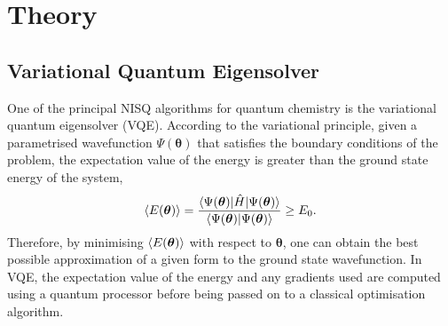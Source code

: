 \documentclass[%
 reprint,
 amsmath,amssymb,
 aps,
]{revtex4-2}
\begin{document}
\section{Theory}

\subsection{Variational Quantum Eigensolver}

One of the principal NISQ algorithms for quantum chemistry is the variational quantum eigensolver (VQE).\cite{Peruzzo2014} According to the variational principle, given a parametrised wavefunction $\Psi(\boldsymbol{\theta})$ that satisfies the boundary conditions of the problem, the expectation value of the energy is greater than the ground state energy of the system,
\begin{equation}
\braket{E(\boldsymbol{\theta})} = \frac{\braket{\Psi(\boldsymbol\theta)|\hat H | \Psi(\boldsymbol{\theta})}}{\braket{\Psi(\boldsymbol{\theta})| \Psi(\boldsymbol{\theta})}} \geq E_0.
\end{equation}
Therefore, by minimising $\braket{E(\boldsymbol{\theta})}$ with respect to $\boldsymbol{\theta}$, one can obtain the best possible approximation of a given form to the ground state wavefunction.
In VQE, the expectation value of the energy and any gradients used are computed using a quantum processor before being passed on to a classical optimisation algorithm.
\end{document}
